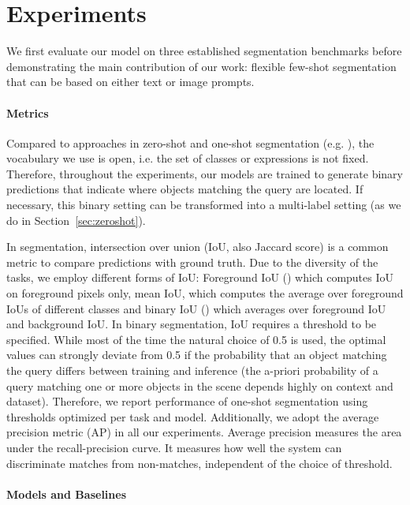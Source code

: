 \documentclass[10pt,twocolumn,letterpaper]{article}
\begin{document}
\section{Experiments}

We first evaluate our model on three established segmentation benchmarks before demonstrating the main contribution of our work: flexible few-shot segmentation that can be based on either text or image prompts.



\paragraph{Metrics}


Compared to approaches in zero-shot and one-shot segmentation (e.g. \cite{bucher19, li20}), the vocabulary we use is open, i.e. the set of classes or expressions is not fixed. Therefore, throughout the experiments, our models are trained to generate binary predictions that indicate where objects matching the query are located. If necessary, this binary setting can be transformed into a multi-label setting (as we do in Section~\ref{sec:zeroshot}).

In segmentation, intersection over union (IoU, also Jaccard score) is a common metric to compare predictions with ground truth. 
Due to the diversity of the tasks, we employ different forms of IoU: Foreground IoU () which computes IoU on foreground pixels only, mean IoU, which computes the average over foreground IoUs of different classes and binary IoU () which averages over foreground IoU and background IoU.
In binary segmentation, IoU requires a threshold  to be specified. While most of the time the natural choice of 0.5 is used, the optimal values can strongly deviate from 0.5 if the probability that an object matching the query differs between training and inference (the a-priori probability of a query matching one or more objects in the scene depends highly on context and dataset). 
Therefore, we report performance of one-shot segmentation using thresholds  optimized per task and model. Additionally, we adopt the average precision metric (AP) in all our experiments.
Average precision measures the area under the recall-precision curve. It measures how well the system can discriminate matches from non-matches, independent of the choice of threshold. 



\paragraph{Models and Baselines}
\end{document}
